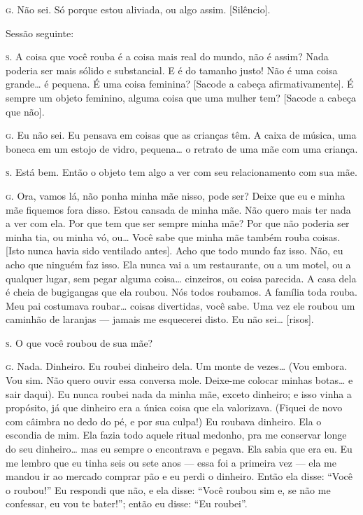 \noindent\hskip0mm\textsc{g.} Não sei. Só porque estou aliviada, ou algo assim. [Silêncio].

\bigskip

Sessão seguinte:

\bigskip

\noindent\hskip0mm\textsc{s.} A coisa que você rouba é a coisa mais real do mundo, não é assim?
Nada poderia ser mais sólido e substancial. E é do tamanho justo! Não é
uma coisa grande\ldots{} é pequena. É uma coisa feminina? [Sacode a cabeça
afirmativamente]. É sempre um objeto feminino, alguma coisa que uma
mulher tem? [Sacode a cabeça que não].

\noindent\hskip0mm\textsc{g.} Eu não sei. Eu pensava em coisas que as crianças têm. A caixa de
música, uma boneca em um estojo de vidro, pequena\ldots{} o retrato de uma
mãe com uma criança.

\noindent\hskip0mm\textsc{s.} Está bem. Então o objeto tem algo a ver com seu relacionamento com
sua mãe.

\noindent\hskip0mm\textsc{g.} Ora, vamos lá, não ponha minha mãe nisso, pode ser? Deixe que eu e
minha mãe fiquemos fora disso. Estou cansada de minha mãe. Não quero
mais ter nada a ver com ela. Por que tem que ser sempre minha mãe? Por
que não poderia ser minha tia, ou minha vó, ou\ldots{} Você sabe que minha
mãe também rouba coisas. [Isto nunca havia sido ventilado antes]. Acho
que todo mundo faz isso. Não, eu acho que ninguém faz isso. Ela nunca
vai a um restaurante, ou a um motel, ou a qualquer lugar, sem pegar
alguma coisa\ldots{} cinzeiros, ou coisa parecida. A casa dela é cheia de
bugigangas que ela roubou. Nós todos roubamos. A família toda rouba.
Meu pai costumava roubar\ldots{} coisas divertidas, você sabe. Uma vez ele
roubou um caminhão de laranjas --- jamais me esquecerei disto. Eu não
sei\ldots{} [risos].

\noindent\hskip0mm\textsc{s.} O que você roubou de sua mãe?

\noindent\hskip0mm\textsc{g.} Nada. Dinheiro. Eu roubei dinheiro dela. Um monte de vezes\ldots{} (Vou
embora. Vou sim. Não quero ouvir essa conversa mole. Deixe-me colocar
minhas botas\ldots{} e sair daqui). Eu nunca roubei nada da minha mãe,
exceto dinheiro; e isso vinha a propósito, já que dinheiro era a única
coisa que ela valorizava. (Fiquei de novo com câimbra no dedo do pé, e
por sua culpa!) Eu roubava dinheiro. Ela o escondia de mim. Ela fazia
todo aquele ritual medonho, pra me conservar longe do seu dinheiro\ldots{}
mas eu sempre o encontrava e pegava. Ela sabia que era eu. Eu me lembro
que eu tinha seis ou sete anos --- essa foi a primeira vez --- ela me
mandou ir ao mercado comprar pão e eu perdi o dinheiro. Então ela
disse: ``Você o roubou!'' Eu respondi que
não, e ela disse: ``Você roubou sim e, se não me
confessar, eu vou te bater!''; então eu disse:
``Eu roubei''.

